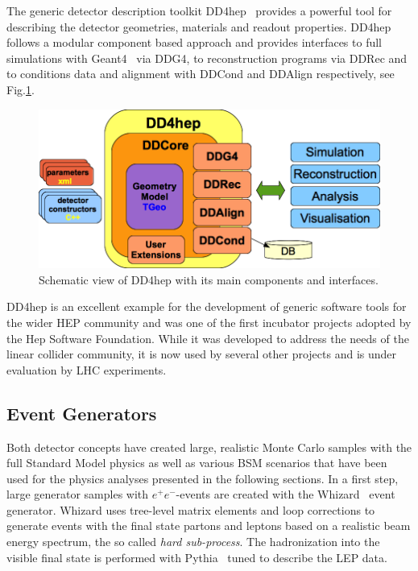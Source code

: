 The generic detector description toolkit DD4hep~\cite{Frank:2014zya,Frank:2015ivo} provides a powerful tool for describing
the detector geometries, materials and readout properties. DD4hep follows a modular component based approach and provides
interfaces to full simulations with Geant4~\cite{Agostinelli:2002hh} via DDG4, to reconstruction programs via DDRec and to
conditions data and alignment with DDCond and DDAlign respectively, see Fig.\ref{fig:dd4hep}.
\begin{figure}
\begin{center}
\includegraphics[width=0.90\hsize]{chapters/figures/dd4hep_simple_schema.png}
\end{center}
\caption{Schematic view of DD4hep with its main components and interfaces.}
\label{fig:dd4hep}
\end{figure}
DD4hep is an excellent example for the development of generic software tools for the wider HEP community and was one of the
first incubator projects adopted by the Hep Software Foundation. While it was developed to address the needs of the linear
collider community, it is now used by several other projects and is under evaluation by LHC experiments.


\subsection{\label{sub:sw-generators}Event Generators}

Both detector concepts have created large, realistic Monte Carlo samples with the full Standard Model physics as well as various
BSM scenarios that have been used for the physics analyses presented in the following sections.
In a first step, large generator samples with $e^+e^-$-events are created with the Whizard~\cite{Kilian:2007gr} event generator.
Whizard uses tree-level matrix elements and loop corrections to generate events with the final state partons and leptons
based on a realistic beam energy spectrum, the so called \emph{hard sub-process}. The hadronization into the visible final state
is performed with Pythia~\cite{Sjostrand:2006za} tuned to describe the LEP data.

